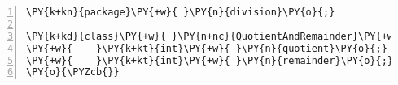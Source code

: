 \begin{Verbatim}[commandchars=\\\{\},numbers=left,firstnumber=1,stepnumber=1,frame=single,fontsize=\small]
\PY{k+kn}{package}\PY{+w}{ }\PY{n}{division}\PY{o}{;}

\PY{k+kd}{class}\PY{+w}{ }\PY{n+nc}{QuotientAndRemainder}\PY{+w}{ }\PY{k+kd}{implements}\PY{+w}{ }\PY{n}{Output}\PY{+w}{ }\PY{o}{\PYZob{}}
\PY{+w}{    }\PY{k+kt}{int}\PY{+w}{ }\PY{n}{quotient}\PY{o}{;}
\PY{+w}{    }\PY{k+kt}{int}\PY{+w}{ }\PY{n}{remainder}\PY{o}{;}
\PY{o}{\PYZcb{}}
\end{Verbatim}
